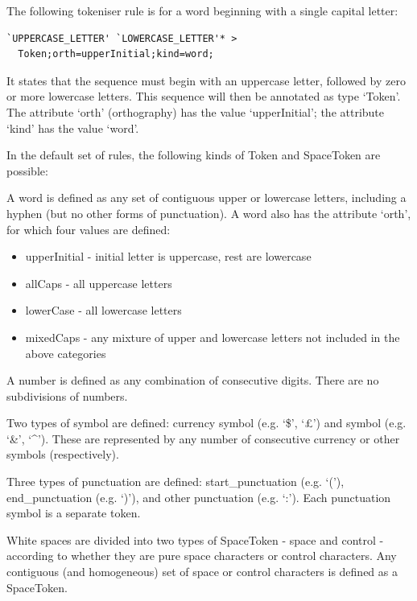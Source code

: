 \noindent
The following tokeniser rule is for a word
beginning with a single capital letter:
\begin{small}
\begin{verbatim}
`UPPERCASE_LETTER' `LOWERCASE_LETTER'* >
  Token;orth=upperInitial;kind=word;
\end{verbatim}
\end{small}
\noindent
It states that the sequence must begin with an uppercase letter,
followed by zero or more lowercase letters. This sequence will then be
annotated as type `Token'. The attribute `orth' (orthography) has
the value `upperInitial'; the attribute `kind' has the value
`word'.

In the default set of rules, the following kinds of Token and
SpaceToken are possible:

A word is defined as any set of
contiguous upper or lowercase letters, including a hyphen (but no other
forms of punctuation). A word also has the attribute `orth', for which
four values are defined:
\begin{itemize}
\item upperInitial - initial letter is uppercase, rest are lowercase
\item allCaps - all uppercase letters
\item lowerCase - all lowercase letters
\item mixedCaps - any mixture of upper and lowercase letters not
included in the above categories
\end{itemize}

A number is defined as any combination of consecutive digits. There
are no subdivisions of numbers.

Two types of symbol are defined: currency symbol (e.g. `\$', `\pounds') and
symbol (e.g. `\&', `\^{ }').
These are represented by any number of consecutive currency or other
symbols (respectively).

Three types of punctuation are defined: start\_punctuation (e.g. `('),
end\_punctuation (e.g. `)'), and other punctuation (e.g. `:'). Each
punctuation symbol is a separate token.


White spaces are divided into two types of SpaceToken - space and
control - according to whether they are pure space characters or
control characters. Any contiguous (and homogeneous) set of space or
control characters is defined as a SpaceToken.


